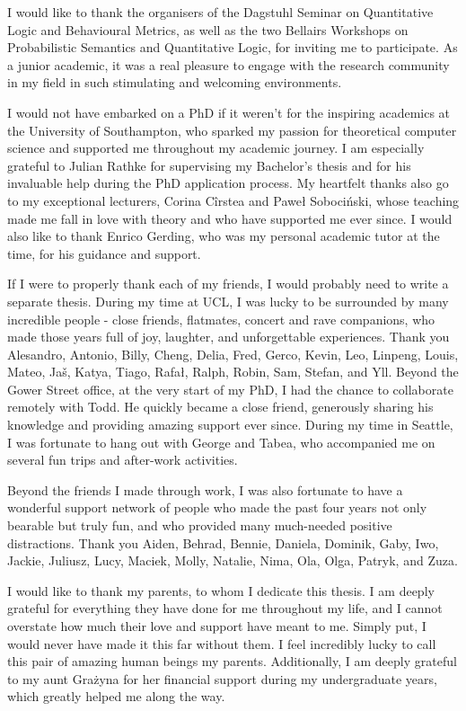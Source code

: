 \begin{acknowledgements}
I would like to thank the organisers of the Dagstuhl Seminar on Quantitative Logic and Behavioural Metrics, as well as the two Bellairs Workshops on Probabilistic Semantics and Quantitative Logic, for inviting me to participate. As a junior academic, it was a real pleasure to engage with the research community in my field in such stimulating and welcoming environments.

I would not have embarked on a PhD if it weren’t for the inspiring academics at the University of Southampton, who sparked my passion for theoretical computer science and supported me throughout my academic journey. I am especially grateful to Julian Rathke for supervising my Bachelor's thesis and for his invaluable help during the PhD application process. My heartfelt thanks also go to my exceptional lecturers, Corina Cîrstea and Paweł Sobociński, whose teaching made me fall in love with theory and who have supported me ever since. I would also like to thank Enrico Gerding, who was my personal academic tutor at the time, for his guidance and support.

If I were to properly thank each of my friends, I would probably need to write a separate thesis. During my time at UCL, I was lucky to be surrounded by many incredible people - close friends, flatmates, concert and rave companions, who made those years full of joy, laughter, and unforgettable experiences. Thank you Alesandro, Antonio, Billy, Cheng, Delia, Fred, Gerco, Kevin, Leo, Linpeng, Louis, Mateo, Jaš, Katya, Tiago, Rafał, Ralph, Robin, Sam, Stefan, and Yll. 
Beyond the Gower Street office, at the very start of my PhD, I had the chance to collaborate remotely with Todd. He quickly became a close friend, generously sharing his knowledge and providing amazing support ever since. During my time in Seattle, I was fortunate to hang out with George and Tabea, who accompanied me on several fun trips and after-work activities.

Beyond the friends I made through work, I was also fortunate to have a wonderful support network of people who made the past four years not only bearable but truly fun, and who provided many much-needed positive distractions. Thank you Aiden, Behrad, Bennie, Daniela, Dominik, Gaby, Iwo, Jackie, Juliusz, Lucy, Maciek, Molly, Natalie, Nima, Ola, Olga, Patryk, and Zuza. 

I would like to thank my parents, to whom I dedicate this thesis. I am deeply grateful for everything they have done for me throughout my life, and I cannot overstate how much their love and support have meant to me. Simply put, I would never have made it this far without them. I feel incredibly lucky to call this pair of amazing human beings my parents. Additionally, I am deeply grateful to my aunt Grażyna for her financial support during my undergraduate years, which greatly helped me along the way.


\end{acknowledgements}
